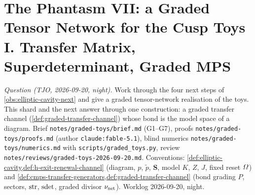 
\section{The Phantasm VII: a Graded Tensor Network for the Cusp Toys I. Transfer Matrix, Superdeterminant, Graded MPS}
\label{sec:graded-toys-network}

\emph{Question (TJO, 2026-09-20, night).} Work through the four next steps of
\cref{obs:elliptic-cavity-next} and give a graded tensor-network realisation of the toys. This shard
and the next answer through one construction: a graded transfer channel (\cref{def:graded-transfer-channel})
whose bond is the model space of a diagram. Brief \texttt{notes/graded-toys/brief.md} (G1--G7), proofs
\texttt{notes/graded-toys/proofs.md} (author \texttt{claude:fable-5.1}), blind numerics
\texttt{notes/graded-toys/numerics.md} with \texttt{scripts/graded\_toys.py}, review
\texttt{notes/reviews/graded-toys-2026-09-20.md}. Conventions: \cref{def:elliptic-cavity,def:h-exit-renewal-channel}
(diagram, $p$, $\tilde p$, $\mathbf S$, model $K$, $Z$, $J$, fixed reset $\varOmega$) and
\cref{def:cmps-transfer-generators,def:graded-transfer-channel} (bond grading $P$, sectors, $\operatorname{str}$, $\operatorname{sdet}$,
graded divisor $\nu_{\mathrm{net}}$). Worklog 2026-09-20, night.

